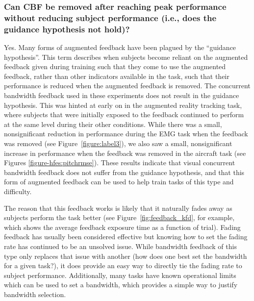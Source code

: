 \subsubsection{Can CBF be removed after reaching peak performance without reducing subject performance (i.e., does the guidance hypothesis not hold)?}
Yes.
Many forms of augmented feedback have been plagued by the ``guidance hypothesis''.
This term describes when subjects become reliant on the augmented feedback given during training such that they come to use the augmented feedback, rather than other indicators available in the task, such that their performance is reduced when the augmented feedback is removed.
The concurrent bandwidth feedback used in these experiments does not result in the guidance hypothesis.
This was hinted at early on in the augmented reality tracking task, where subjects that were initially exposed to the feedback continued to perform at the same level during their other conditions.
While there was a small, nonsignificant reduction in performance during the EMG task when the feedback was removed (see Figure~\ref{figure:label3}), we also saw a small, nonsignificant increase in performance when the feedback was removed in the aircraft task (see Figures \ref{figure-hfes:pitchrmse}).
These results indicate that visual concurrent bandwidth feedback does not suffer from the guidance hypothesis, and that this form of augmented feedback can be used to help train tasks of this type and difficulty.

The reason that this feedback works is likely that it naturally fades away as subjects perform the task better (see Figure~\ref{fig:feedback_kfd}, for example, which shows the average feedback exposure time as a function of trial).
Fading feedback has usually been considered effective but knowing how to set the fading rate has continued to be an unsolved issue.
While bandwidth feedback of this type only replaces that issue with another (how does one best set the bandwidth for a given task?), it does provide an easy way to directly tie the fading rate to subject performance.
Additionally, many tasks have known operational limits which can be used to set a bandwidth, which provides a simple way to justify bandwidth selection.


